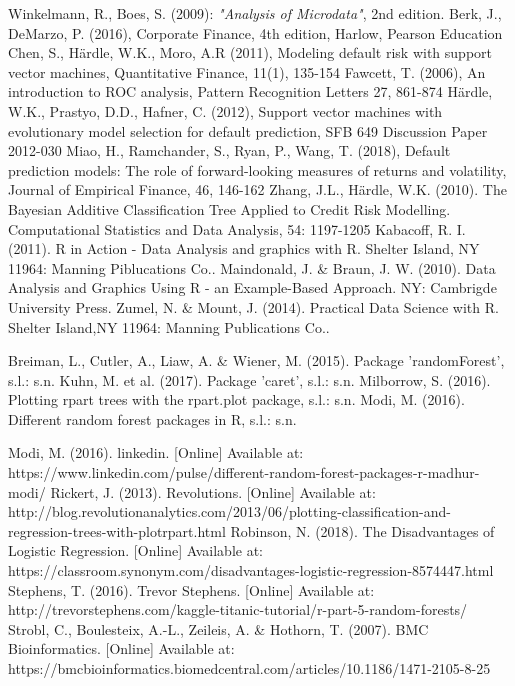 \documentclass{article}
\begin{document}
\begin{thebibliography}{9}
  Winkelmann, R., Boes, S. (2009): \textit{"Analysis of Microdata"}, 2nd edition.
  Berk, J., DeMarzo, P. (2016), Corporate Finance, 4th edition, Harlow, Pearson Education 
  Chen, S., H{\"a}rdle, W.K., Moro, A.R (2011), Modeling default risk with support vector machines,  Quantitative Finance, 11(1), 135-154
  Fawcett, T. (2006), An introduction to ROC analysis, Pattern Recognition Letters 27, 861-874
  H{\"a}rdle, W.K., Prastyo, D.D., Hafner, C. (2012), Support vector machines with evolutionary model selection for default prediction, SFB 649 Discussion Paper 2012-030
  Miao, H., Ramchander, S., Ryan, P., Wang, T. (2018), Default prediction models: The role of forward-looking measures of returns and volatility, Journal of Empirical Finance, 46, 146-162
  Zhang, J.L., H{\"a}rdle, W.K. (2010). The Bayesian Additive Classification Tree Applied to Credit Risk Modelling. Computational Statistics and Data Analysis, 54: 1197-1205 
Kabacoff, R. I. (2011). R in Action - Data Analysis and graphics with R. Shelter Island, NY 11964: Manning Piblucations Co..
Maindonald, J. \& Braun, J. W. (2010). Data Analysis and Graphics Using R - an Example-Based Approach. NY: Cambrigde University Press.
Zumel, N. \& Mount, J. (2014). Practical Data Science with R. Shelter Island,NY 11964: Manning Publications Co..


Breiman, L., Cutler, A., Liaw, A. \& Wiener, M. (2015). Package 'randomForest', s.l.: s.n.
Kuhn, M. et al. (2017). Package 'caret', s.l.: s.n.
Milborrow, S. (2016). Plotting rpart trees with the rpart.plot package, s.l.: s.n.
Modi, M. (2016). Different random forest packages in R, s.l.: s.n.

Modi, M. (2016). linkedin. [Online] 
Available at: https://www.linkedin.com/pulse/different-random-forest-packages-r-madhur-modi/
Rickert, J. (2013). Revolutions. [Online] 
Available at: http://blog.revolutionanalytics.com/2013/06/plotting-classification-and-regression-trees-with-plotrpart.html
Robinson, N. (2018). The Disadvantages of Logistic Regression. [Online] 
Available at: https://classroom.synonym.com/disadvantages-logistic-regression-8574447.html
Stephens, T. (2016). Trevor Stephens. [Online] 
Available at: http://trevorstephens.com/kaggle-titanic-tutorial/r-part-5-random-forests/
Strobl, C., Boulesteix, A.-L., Zeileis, A. \& Hothorn, T. (2007). BMC Bioinformatics. [Online] 
Available at: https://bmcbioinformatics.biomedcentral.com/articles/10.1186/1471-2105-8-25


\end{thebibliography}
\end{document}
